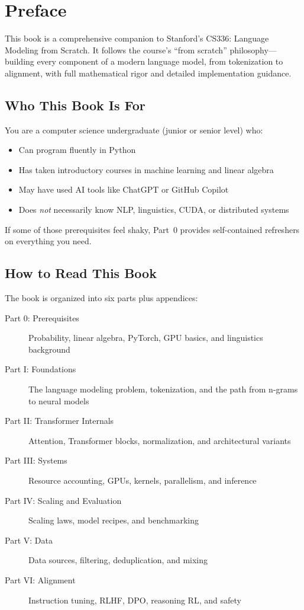 \chapter*{Preface}

This book is a comprehensive companion to Stanford's CS336: Language Modeling from Scratch. It follows the course's ``from scratch'' philosophy---building every component of a modern language model, from tokenization to alignment, with full mathematical rigor and detailed implementation guidance.

\section*{Who This Book Is For}

You are a computer science undergraduate (junior or senior level) who:
\begin{itemize}
  \item Can program fluently in Python
  \item Has taken introductory courses in machine learning and linear algebra
  \item May have used AI tools like ChatGPT or GitHub Copilot
  \item Does \emph{not} necessarily know NLP, linguistics, CUDA, or distributed systems
\end{itemize}

If some of those prerequisites feel shaky, Part~0 provides self-contained refreshers on everything you need.

\section*{How to Read This Book}

The book is organized into six parts plus appendices:
\begin{description}
  \item[Part 0: Prerequisites] Probability, linear algebra, PyTorch, GPU basics, and linguistics background
  \item[Part I: Foundations] The language modeling problem, tokenization, and the path from n-grams to neural models
  \item[Part II: Transformer Internals] Attention, Transformer blocks, normalization, and architectural variants
  \item[Part III: Systems] Resource accounting, GPUs, kernels, parallelism, and inference
  \item[Part IV: Scaling and Evaluation] Scaling laws, model recipes, and benchmarking
  \item[Part V: Data] Data sources, filtering, deduplication, and mixing
  \item[Part VI: Alignment] Instruction tuning, RLHF, DPO, reasoning RL, and safety
\end{description}

